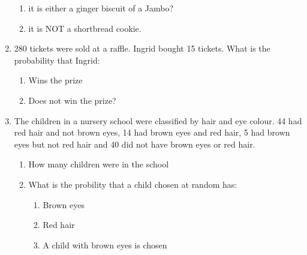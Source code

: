 \begin{enumerate}[noitemsep, label=\textbf{\arabic*}. ]
\label{m39373*id116177}\begin{enumerate}[noitemsep, label=\textbf{\alph*}. ] 
            \label{m39373*uid126}\item it is either a ginger biscuit of a
Jambo?
\label{m39373*uid127}\item it is NOT a shortbread cookie.
\end{enumerate}
                \label{m39373*uid128}\item 280 tickets were sold at a raffle. Ingrid bought 15
tickets. What is the probability that Ingrid:
\label{m39373*id116219}\begin{enumerate}[noitemsep, label=\textbf{\alph*}. ] 
            \label{m39373*uid129}\item Wins the prize
\label{m39373*uid130}\item Does not win the prize?
\end{enumerate}
                \label{m39373*uid131}\item The children in a nursery school were classified by
hair and eye colour. 44 had red hair and not brown eyes, 14 had brown eyes and
red hair, 5 had brown eyes but not red hair and 40 did not have brown eyes or
red hair.
\label{m39373*id116261}\begin{enumerate}[noitemsep, label=\textbf{\alph*}. ] 
            \label{m39373*uid132}\item How many children were in the
school
\label{m39373*uid133}\item What is the probility that a child chosen at random
has:
\label{m39373*id116289}\begin{enumerate}[noitemsep, label=\textbf{\arabic*}. ] 
            \label{m39373*uid134}\item Brown eyes
\label{m39373*uid135}\item Red hair
%     
        \label{m39373*uid136}\item A child with brown eyes is chosen

\end{enumerate}
\end{enumerate}
\end{enumerate}
